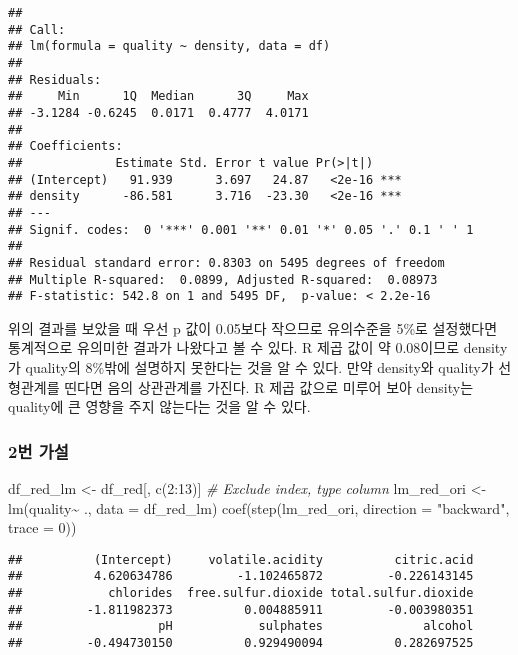 \documentclass[
]{article}
\newenvironment{Shaded}{\begin{snugshade}}{\end{snugshade}}
\newcommand{\AttributeTok}[1]{\textcolor[rgb]{0.77,0.63,0.00}{#1}}
\newcommand{\CommentTok}[1]{\textcolor[rgb]{0.56,0.35,0.01}{\textit{#1}}}
\newcommand{\DecValTok}[1]{\textcolor[rgb]{0.00,0.00,0.81}{#1}}
\newcommand{\FunctionTok}[1]{\textcolor[rgb]{0.00,0.00,0.00}{#1}}
\newcommand{\NormalTok}[1]{#1}
\newcommand{\OtherTok}[1]{\textcolor[rgb]{0.56,0.35,0.01}{#1}}
\newcommand{\SpecialCharTok}[1]{\textcolor[rgb]{0.00,0.00,0.00}{#1}}
\newcommand{\StringTok}[1]{\textcolor[rgb]{0.31,0.60,0.02}{#1}}
\begin{document}
\begin{verbatim}
## 
## Call:
## lm(formula = quality ~ density, data = df)
## 
## Residuals:
##     Min      1Q  Median      3Q     Max 
## -3.1284 -0.6245  0.0171  0.4777  4.0171 
## 
## Coefficients:
##             Estimate Std. Error t value Pr(>|t|)    
## (Intercept)   91.939      3.697   24.87   <2e-16 ***
## density      -86.581      3.716  -23.30   <2e-16 ***
## ---
## Signif. codes:  0 '***' 0.001 '**' 0.01 '*' 0.05 '.' 0.1 ' ' 1
## 
## Residual standard error: 0.8303 on 5495 degrees of freedom
## Multiple R-squared:  0.0899, Adjusted R-squared:  0.08973 
## F-statistic: 542.8 on 1 and 5495 DF,  p-value: < 2.2e-16
\end{verbatim}

위의 결과를 보았을 때 우선 p 값이 0.05보다 작으므로 유의수준을 5\%로
설정했다면 통계적으로 유의미한 결과가 나왔다고 볼 수 있다. R 제곱 값이
약 0.08이므로 density가 quality의 8\%밖에 설명하지 못한다는 것을 알 수
있다. 만약 density와 quality가 선형관계를 띤다면 음의 상관관계를 가진다.
R 제곱 값으로 미루어 보아 density는 quality에 큰 영향을 주지 않는다는
것을 알 수 있다.

\hypertarget{uxbc88-uxac00uxc124-1}{%
\subsubsection{2번 가설}\label{uxbc88-uxac00uxc124-1}}

\begin{Shaded}
\begin{Highlighting}[]
\NormalTok{df\_red\_lm }\OtherTok{\textless{}{-}}\NormalTok{ df\_red[, }\FunctionTok{c}\NormalTok{(}\DecValTok{2}\SpecialCharTok{:}\DecValTok{13}\NormalTok{)]  }\CommentTok{\# Exclude \textquotesingle{}index\textquotesingle{}, \textquotesingle{}type\textquotesingle{} column}
\NormalTok{lm\_red\_ori }\OtherTok{\textless{}{-}} \FunctionTok{lm}\NormalTok{(quality}\SpecialCharTok{\textasciitilde{}}\NormalTok{ ., }\AttributeTok{data =}\NormalTok{ df\_red\_lm)}
\FunctionTok{coef}\NormalTok{(}\FunctionTok{step}\NormalTok{(lm\_red\_ori, }\AttributeTok{direction =} \StringTok{"backward"}\NormalTok{, }\AttributeTok{trace =} \DecValTok{0}\NormalTok{))}
\end{Highlighting}
\end{Shaded}

\begin{verbatim}
##          (Intercept)     volatile.acidity          citric.acid 
##          4.620634786         -1.102465872         -0.226143145 
##            chlorides  free.sulfur.dioxide total.sulfur.dioxide 
##         -1.811982373          0.004885911         -0.003980351 
##                   pH            sulphates              alcohol 
##         -0.494730150          0.929490094          0.282697525
\end{verbatim}
\end{document}
